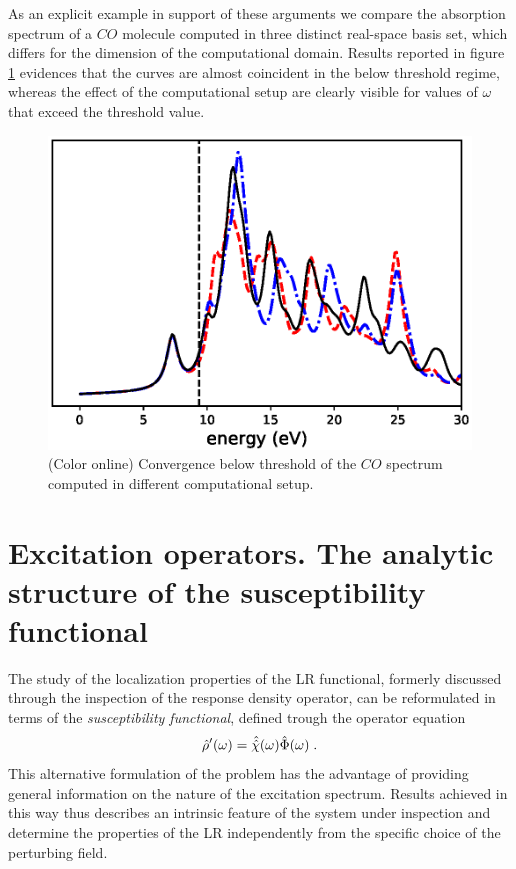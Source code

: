 \documentclass[reprint,aps,prb]{revtex4-1}
\newcommand{\be}{\begin{equation}}
\newcommand{\ee}{\end{equation}}
\newcommand{\lb}{\label}
\newcommand{\op}[1]{\hat {#1}}
\newcommand{\sop}[1]{\op{\op {#1}}}
\newcommand{\dm}{\op{\rho}}
\begin{document}
As an explicit example in support of these arguments we compare the absorption spectrum of a $CO$ molecule computed in three distinct real-space basis set, which differs for the dimension of 
the computational domain. Results reported in figure \ref{co_spectrum} evidences that the curves are almost coincident in the below threshold regime, whereas the effect of the computational 
setup are clearly visible for values of $\omega$ that exceed the threshold value. 

\begin{figure}
\includegraphics[scale=0.56]{co_spectrum.eps}
\caption{\label{co_spectrum}(Color online) Convergence below threshold of the $CO$ spectrum computed in different computational setup.}
\end{figure}


\section{Excitation operators. The analytic structure of the susceptibility functional}

The study of the localization properties of the LR functional, formerly discussed through the inspection of the response density operator, can be reformulated in terms of the 
\emph{susceptibility functional}, defined trough the operator equation  
\be\lb{SusceptibilityDef1}
\dm'(\omega) = \sop{{\cal \chi}}(\omega) \op\Phi(\omega) \;. 
\ee
This alternative formulation of the problem has the advantage of providing general information on the nature of the excitation spectrum. Results achieved in this way thus describes an intrinsic 
feature of the system under inspection and determine the properties of the LR independently from the specific choice of the perturbing field. 
\end{document}
